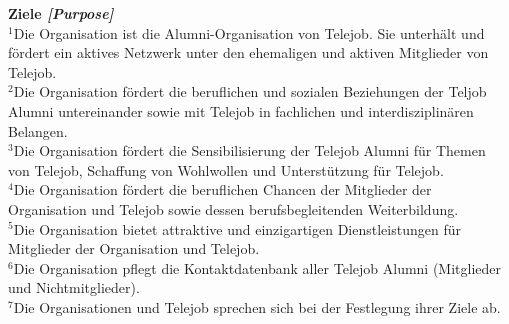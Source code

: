 \documentclass[10pt]{article}
\newcounter{qcounter}
\begin{document}
\begin{list}{{\bf Artikel :~}}{}
\item {\bf Ziele {\it [Purpose]}}\\
$^{1}$Die Organisation ist die Alumni-Organisation von Telejob. Sie unterh\"alt und f\"ordert ein aktives Netzwerk unter den ehemaligen und aktiven Mitglieder von Telejob.\\
$^{2}$Die Organisation f\"ordert die beruflichen und sozialen Beziehungen der Teljob Alumni untereinander sowie mit Telejob in fachlichen und interdisziplin\"aren Belangen.\\
$^{3}$Die Organisation f\"ordert die Sensibilisierung der Telejob Alumni f\"ur Themen von Telejob, Schaffung von Wohlwollen und Unterst\"utzung f\"ur Telejob.\\
$^{4}$Die Organisation f\"ordert die beruflichen Chancen der Mitglieder der Organisation und Telejob sowie dessen berufsbegleitenden Weiterbildung.\\
$^{5}$Die Organisation bietet attraktive und einzigartigen Dienstleistungen f\"ur Mitglieder der Organisation und Telejob.\\
$^{6}$Die Organisation pflegt die Kontaktdatenbank aller Telejob Alumni (Mitglieder und Nichtmitglieder).\\
$^{7}$Die Organisationen und Telejob sprechen sich bei der Festlegung ihrer Ziele ab.\\



\end{list}
\end{document}

